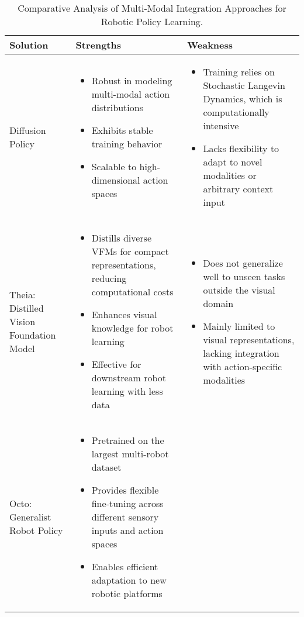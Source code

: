 \documentclass[12pt]{article}
\begin{document}
\begin{longtable}{p{5cm}|p{5cm}|p{5cm}}
\caption{Comparative Analysis of Multi-Modal Integration Approaches for Robotic Policy Learning.}

    \hline
    Solution & Strengths & Weakness \\
    \hline
    Diffusion Policy~\cite{Chi2023DiffusionPV} & 
    \begin{itemize}
        \item Robust in modeling multi-modal action distributions
        \item Exhibits stable training behavior
        \item Scalable to high-dimensional action spaces
    \end{itemize} & 
    \begin{itemize}
        \item Training relies on Stochastic Langevin Dynamics, which is computationally intensive
        \item Lacks flexibility to adapt to novel modalities or arbitrary context input
    \end{itemize} \\
    \hline
    Theia: Distilled Vision Foundation Model~\cite{Shang2024TheiaDD} & 
    \begin{itemize}
        \item Distills diverse VFMs for compact representations, reducing computational costs
        \item Enhances visual knowledge for robot learning
        \item Effective for downstream robot learning with less data
    \end{itemize} & 
    \begin{itemize}
        \item Does not generalize well to unseen tasks outside the visual domain
        \item Mainly limited to visual representations, lacking integration with action-specific modalities
    \end{itemize} \\
        \hline
    Octo: Generalist Robot Policy\cite{Team2024OctoAO} & 
    \begin{itemize}
        \item Pretrained on the largest multi-robot dataset
        \item Provides flexible fine-tuning across different sensory inputs and action spaces
        \item Enables efficient adaptation to new robotic platforms

\end{itemize}
\end{longtable}
\end{document}
